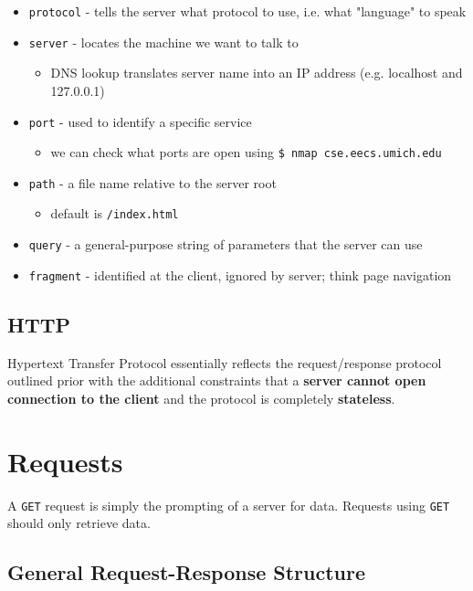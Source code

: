 \begin{itemize}
	\item \texttt{protocol} - tells the server what protocol to use, i.e. what "language" to speak
	\item \texttt{server} - locates the machine we want to talk to
	\begin{itemize}
		\item DNS lookup translates server name into an IP address (e.g. localhost and 127.0.0.1)
	\end{itemize}
	\item \texttt{port} - used to identify a specific service
	\begin{itemize}
		\item we can check what ports are open using \texttt{\$ nmap cse.eecs.umich.edu}
	\end{itemize}
	\item \texttt{path} - a file name relative to the server root
	\begin{itemize}
		\item default is \texttt{/index.html}
	\end{itemize}
	\item \texttt{query} - a general-purpose string of parameters that the server can use
	\item \texttt{fragment} - identified at the client, ignored by server; think page navigation
\end{itemize}

\subsection{HTTP}
Hypertext Transfer Protocol essentially reflects the request/response protocol outlined prior with the additional constraints that a \textbf{server cannot open connection to the client} and the protocol is completely \textbf{stateless}.

\section{Requests}

\begin{definition}
	A \texttt{GET} request is simply the prompting of a server for data. Requests using \texttt{GET} should only retrieve data.
\end{definition}

\subsection{General Request-Response Structure}

